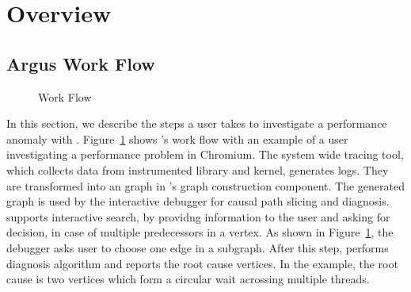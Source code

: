 \section{Overview}\label{sec:overview}

\subsection{Argus Work Flow}
\begin{figure}[tb]
    \centering
	
    \caption{\xxx Work Flow}
    \label{fig:argus-overview}
\end{figure}

In this section, we describe the steps a user takes to investigate a performance
anomaly with \xxx. Figure~\ref{fig:argus-overview} shows \xxx's work flow with
an example of a user investigating a performance problem in Chromium. The system
wide tracing tool, which collects data from \xxx instrumented library and
kernel, generates logs. They are transformed into an graph in \xxx's
graph construction component. The generated graph is used by the interactive
debugger for causal path slicing and diagnosis. \xxx supports interactive
search, by providng information to the user and asking for decision, in case of
multiple predecessors in a vertex. As shown in Figure~\ref{fig:argus-overview},
the debugger asks user to choose one edge in a subgraph. After this step,
\xxx performs diagnosis algorithm and reports the root cause vertices. In the
example, the root cause is two vertices which form a circular wait acrossing
multiple threads.



%
%

